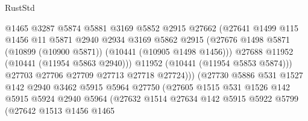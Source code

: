 \begin{lexlean}{RustStd}
\begin{coremodule}
                                  @1465
                                  @3287
                                  @5874
                                  @5881
                                  @3169
                                  @5852
                                  @2915
                                  @27662
                                  (@27641
                                    @1499
                                    @115
                                    @1456
                                    @11
                                    @5871
                                    @2940
                                    @2934
                                    @3169
                                    @5862
                                    @2915
                                    (@27676
                                      @1498
                                      @5871
                                      (@10899 (@10900 @5871))
                                      (@10441 (@10905 @1498 @1456)))
                                    @27688
                                    @11952
                                    (@10441 (@11954 @5863 @2940)))
                                  @11952
                                  (@10441 (@11954 @5853 @5874)))
                                @27703
                                @27706
                                @27709
                                @27713
                                @27718
                                @27724)))
                          (@27730
                            @5886
                            @531
                            @1527
                            @142
                            @2940
                            @3462
                            @5915
                            @5964
                            @27750
                            (@27605
                              @1515
                              @531
                              @1526
                              @142
                              @5915
                              @5924
                              @2940
                              @5964
                              (@27632
                                @1514
                                @27634
                                @142
                                @5915
                                @5922
                                @5799
                                (@27642
                                  @1513
                                  @1456
                                  @1465

\end{coremodule}
\end{lexlean}
